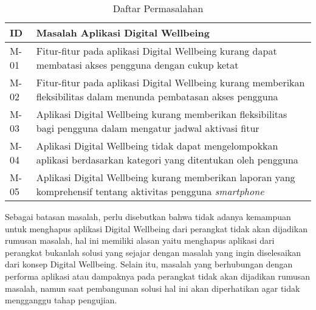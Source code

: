 
\begin{table}[ht]
  \centering
  \fontsize{10}{12}
  \caption{Daftar Permasalahan}
  \label{tab:daftar_permasalahan}
  \vspace{0.2cm}
  \begin{tabular}{|p{}|p{}|}
  \hline
  ID    & Masalah Aplikasi Digital Wellbeing \\ \hline
  M-01    & Fitur-fitur pada aplikasi Digital Wellbeing kurang dapat membatasi akses pengguna dengan cukup ketat \\ \hline
  M-02    & Fitur-fitur pada aplikasi Digital Wellbeing kurang memberikan fleksibilitas dalam menunda pembatasan akses pengguna \\ \hline
  M-03    & Aplikasi Digital Wellbeing kurang memberikan fleksibilitas bagi pengguna dalam mengatur jadwal aktivasi fitur \\ \hline
  M-04    & Aplikasi Digital Wellbeing tidak dapat mengelompokkan aplikasi berdasarkan kategori yang ditentukan oleh pengguna \\ \hline
  M-05    & Aplikasi Digital Wellbeing kurang memberikan laporan yang komprehensif tentang aktivitas pengguna \textit{smartphone} \\ \hline
  \end{tabular}
\end{table}

Sebagai batasan masalah, perlu disebutkan bahwa tidak adanya kemampuan untuk menghapus aplikasi Digital Wellbeing dari perangkat tidak akan dijadikan rumusan masalah, hal ini memiliki alasan yaitu menghapus aplikasi dari perangkat bukanlah solusi yang sejajar dengan masalah yang ingin diselesaikan dari konsep Digital Wellbeing. Selain itu, masalah yang berhubungan dengan performa aplikasi atau dampaknya pada perangkat tidak akan dijadikan rumusan masalah, namun saat pembangunan solusi hal ini akan diperhatikan agar tidak mengganggu tahap pengujian.


